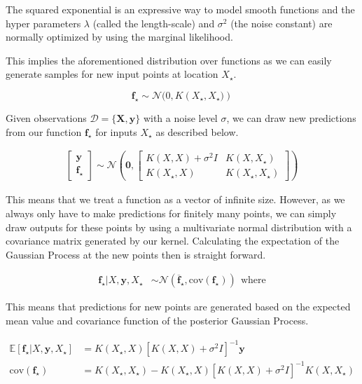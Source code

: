 \documentclass[authoryear,11pt,review]{elsarticle}
\begin{document}
The squared exponential is an expressive way to model smooth functions and the hyper parameters $\lambda$ (called the length-scale) and $\sigma^2$ (the noise constant) are normally optimized by using the marginal likelihood.

This implies the aforementioned distribution over functions as we can easily generate samples for new input points at location $X_\star$.

\begin{equation*}
\mathbf{f_\star} \sim \mathcal{N}(0, K\left(X_\star,X_\star)\right)
\end{equation*}


Given observations $\mathcal{D}=\{\mathbf{X}, \mathbf{y}\}$ with a noise level $\sigma$, we can draw new predictions from our function $\mathbf{f}_\star$ for inputs $X_\star$ as described below.

\begin{align*}
\begin{bmatrix}
       \mathbf{y}         \\[0.3em]
       \mathbf{f}_\star 
     \end{bmatrix}
\sim \mathcal{N}\left(\mathbf{0}, 
 \begin{bmatrix}
K(X,X)+\sigma^2 I & K(X,X_\star)       \\[0.3em]
K(X_\star, X) & K(X_\star, X_\star)
     \end{bmatrix}
\right)
\end{align*}

This means that we treat a function as a vector of infinite size. However, as we always only have to make predictions for finitely many points, we can simply draw outputs for these points by using a multivariate normal distribution with a covariance matrix generated by our kernel. Calculating the expectation of the Gaussian Process at the new points then is straight forward.

\begin{align*}
\mathbf{f}_\star|X,\mathbf{y},X_\star &\sim \mathcal{N}(\overline{\mathbf{f}}_\star, \text{cov}(\mathbf{f}_\star))~~\text{where}
\end{align*}

This means that predictions for new points are generated based on the expected mean value and covariance function of the posterior Gaussian Process. 

\begin{align*}
\mathbb{E}[\mathbf{f}_\star|X,\mathbf{y},X_\star]&=K(X_\star,X)[K(X,X)+\sigma^2I]^{-1}\mathbf{y} \\
\text{cov}(\mathbf{f}_\star)&=K(X_\star,X_\star)-K(X_\star,X)[K(X,X)+\sigma^2I]^{-1}K(X,X_\star)
\end{align*}
\end{document}
